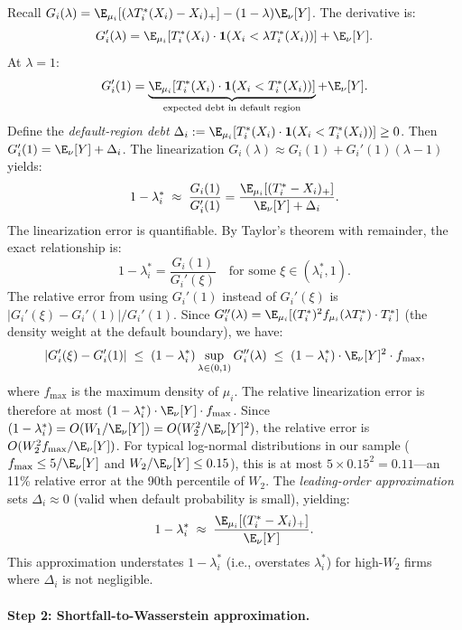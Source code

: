 Recall $G_i(\lambda) = \E_{\mu_i}[(\lambda T_i^*(X_i)-X_i)_+] - (1-\lambda)\E_\nu[Y]$. The derivative is:
\[
  G_i'(\lambda) = \E_{\mu_i}[T_i^*(X_i)\cdot\mathbf{1}(X_i < \lambda T_i^*(X_i))] + \E_\nu[Y].
\]
At $\lambda=1$:
\begin{equation}
  G_i'(1) = \underbrace{\E_{\mu_i}[T_i^*(X_i)\cdot\mathbf{1}(X_i < T_i^*(X_i))]}_{\text{expected debt in default region}} + \E_\nu[Y].
  \label{eq:Gprime_exact}
\end{equation}
Define the \emph{default-region debt} $\Delta_i := \E_{\mu_i}[T_i^*(X_i)\cdot\mathbf{1}(X_i < T_i^*(X_i))] \geq 0$. Then $G_i'(1) = \E_\nu[Y] + \Delta_i$. The linearization $G_i(\lambda) \approx G_i(1) + G_i'(1)(\lambda-1)$ yields:
\begin{equation}
  1 - \lambda_i^* \;\approx\; \frac{G_i(1)}{G_i'(1)} = \frac{\E_{\mu_i}[(T_i^*-X_i)_+]}{\E_\nu[Y] + \Delta_i}.
  \label{eq:lambda_approx_step1}
\end{equation}
The linearization error is quantifiable. By Taylor's theorem with remainder, the exact relationship is:
\[
  1 - \lambda_i^* = \frac{G_i(1)}{G_i'(\xi)} \quad \text{for some } \xi \in (\lambda_i^*, 1).
\]
The relative error from using $G_i'(1)$ instead of $G_i'(\xi)$ is $|G_i'(\xi) - G_i'(1)|/G_i'(1)$. Since $G_i''(\lambda) = \E_{\mu_i}[(T_i^*)^2 f_{\mu_i}(\lambda T_i^*) \cdot T_i^*]$ (the density weight at the default boundary), we have:
\[
  |G_i'(\xi) - G_i'(1)| \;\leq\; (1-\lambda_i^*)\sup_{\lambda \in (0,1)} G_i''(\lambda) \;\leq\; (1-\lambda_i^*) \cdot \E_\nu[Y]^2 \cdot f_{\max},
\]
where $f_{\max}$ is the maximum density of $\mu_i$. The relative linearization error is therefore at most $(1-\lambda_i^*) \cdot \E_\nu[Y] \cdot f_{\max}$. Since $(1-\lambda_i^*) = O(W_1/\E_\nu[Y]) = O(W_2^2/\E_\nu[Y]^2)$, the relative error is $O(W_2^2 f_{\max}/\E_\nu[Y])$. For typical log-normal distributions in our sample ($f_{\max} \leq 5/\E_\nu[Y]$ and $W_2/\E_\nu[Y] \leq 0.15$), this is at most $5 \times 0.15^2 = 0.11$---an 11\% relative error at the 90th percentile of $W_2$. The \emph{leading-order approximation} sets $\Delta_i \approx 0$ (valid when default probability is small), yielding:
\begin{equation}
  1 - \lambda_i^* \;\approx\; \frac{\E_{\mu_i}[(T_i^*-X_i)_+]}{\E_\nu[Y]}.
  \label{eq:lambda_approx_step1b}
\end{equation}
This approximation understates $1-\lambda_i^*$ (i.e., overstates $\lambda_i^*$) for high-$W_2$ firms where $\Delta_i$ is not negligible.

\paragraph{Step 2: Shortfall-to-Wasserstein approximation.}

